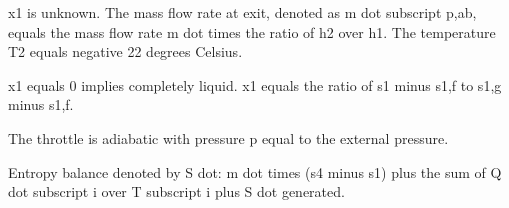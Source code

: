 x1 is unknown.
The mass flow rate at exit, denoted as m dot subscript p,ab, equals the mass flow rate m dot times the ratio of h2 over h1.
The temperature T2 equals negative 22 degrees Celsius.

x1 equals 0 implies completely liquid.
x1 equals the ratio of s1 minus s1,f to s1,g minus s1,f.

The throttle is adiabatic with pressure p equal to the external pressure.

Entropy balance denoted by S dot:
m dot times (s4 minus s1) plus the sum of Q dot subscript i over T subscript i plus S dot generated.